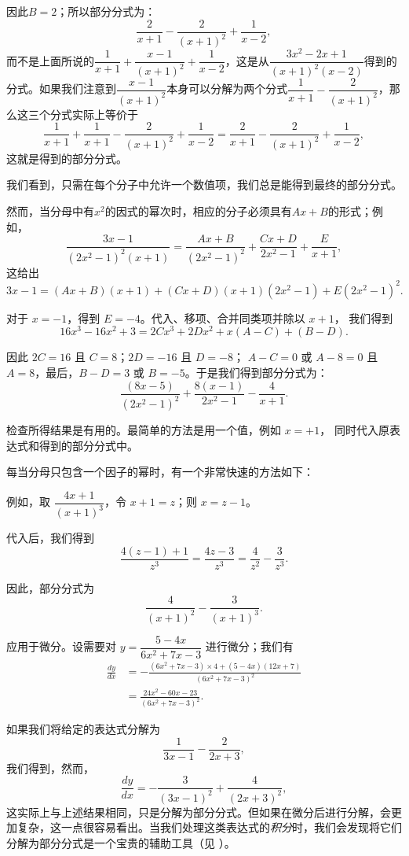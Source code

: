 \documentclass{ctexbook}
\newcommand{\DPPageSep}[2]{\Pagelabel{#2}}
\newcommand{\Pagelabel}[1]
  {\phantomsection\label{#1}}
\newcommand{\Pageref}[2][p.]{%
  \ifthenelse{\not\equal{#1}{}}{%
    \hyperref[#2]{#1~\pageref{#2}}%
  }{%
    \hyperref[#2]{\pageref{#2}}%
  }%
}
\begin{document}
因此$B=2$；所以部分分式为：
\[
\frac{2}{x+1} - \frac{2}{(x+1)^2} + \frac{1}{x-2},
\]
而不是上面所说的$\dfrac{1}{x+1} + \dfrac{x-1}{(x+1)^2} + \dfrac{1}{x-2}$，这是从$\dfrac{3x^2-2x+1}{(x+1)^2(x-2)}$得到的分式。如果我们注意到$\dfrac{x-1}{(x+1)^2}$本身可以分解为两个分式$\dfrac{1}{x+1} - \dfrac{2}{(x+1)^2}$，那么这三个分式实际上等价于
\[
\frac{1}{x+1} + \frac{1}{x+1} - \frac{2}{(x+1)^2} + \frac{1}{x-2}
  = \frac{2}{x+1} - \frac{2}{(x+1)^2} + \frac{1}{x-2},
\]
这就是得到的部分分式。

我们看到，只需在每个分子中允许一个数值项，我们总是能得到最终的部分分式。

然而，当分母中有$x^2$的因式的幂次时，相应的分子必须具有$Ax+B$的形式；例如，
\[
\frac{3x-1}{(2x^2-1)^2(x+1)}
  = \frac{Ax+B}{(2x^2-1)^2} + \frac{Cx+D}{2x^2-1} + \frac{E}{x+1},
\]
\DPPageSep{141.png}{129}%
这给出
\[%
3x - 1 = (Ax + B)(x + 1)
       + (Cx + D)(x + 1)(2x^2 - 1) + E(2x^2 - 1)^2.
\]

对于 $x = -1$，得到 $E = -4$。代入、移项、合并同类项并除以 $x + 1$，
我们得到
\[
16x^3 - 16x^2 + 3 = 2Cx^3 + 2Dx^2 + x(A - C) + (B - D).
\]

因此 $2C = 16$ 且 $C = 8$；$2D = -16$ 且 $D = -8$；
$A - C = 0$ 或 $A - 8 = 0$ 且 $A = 8$，最后，$B - D = 3$
或 $B = -5$。于是我们得到部分分式为：
\[
\frac{(8x - 5)}{(2x^2 - 1)^2} + \frac{8(x - 1)}{2x^2 - 1} - \frac{4}{x + 1}.
\]

检查所得结果是有用的。最简单的方法是用一个值，例如 $x = +1$，
同时代入原表达式和得到的部分分式中。

每当分母只包含一个因子的幂时，有一个非常快速的方法如下：

例如，取 $\dfrac{4x + 1}{(x + 1)^3}$，令 $x + 1 = z$；则
$x = z - 1$。

代入后，我们得到
\[
\frac{4(z - 1) + 1}{z^3} = \frac{4z - 3}{z^3} = \frac{4}{z^2} - \frac{3}{z^3}.
\]

因此，部分分式为
\[
\frac{4}{(x + 1)^2} - \frac{3}{(x + 1)^3}.
\]
\DPPageSep{142.png}{130}%

应用于微分。设需要对 $y = \dfrac{5-4x}{6x^2 + 7x - 3}$ 进行微分；我们有
\begin{align*}
\frac{dy}{dx}
  &= -\frac{(6x^2+7x-3) × 4 + (5 - 4x)(12x + 7)}{(6x^2 + 7x - 3)^2}\\
  &=  \frac{24x^2 - 60x - 23}{(6x^2 + 7x - 3)^2}.
\end{align*}

如果我们将给定的表达式分解为
\[
\frac{1}{3x-1} - \frac{2}{2x+3},
\]
我们得到，然而，
\[
\frac{dy}{dx} = -\frac{3}{(3x-1)^2} + \frac{4}{(2x+3)^2},
\]
这实际上与上述结果相同，只是分解为部分分式。但如果在微分后进行分解，会更加复杂，这一点很容易看出。当我们处理这类表达式的\emph{积分}时，我们会发现将它们分解为部分分式是一个宝贵的辅助工具（见 \Pageref{partfracs}）。
\end{document}
